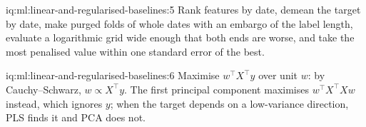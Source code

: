 \begin{solution}{iq:ml:linear-and-regularised-baselines:5}
Rank features by date, demean the target by date, make purged folds of whole dates with an embargo of the label length,
evaluate a logarithmic grid wide enough that both ends are worse, and take the most penalised value within one standard
error of the best.
\end{solution}

\begin{solution}{iq:ml:linear-and-regularised-baselines:6}
Maximise $w^\top X^\top y$ over unit $w$: by Cauchy--Schwarz, $w\propto X^\top y$. The first principal component maximises
$w^\top X^\top Xw$ instead, which ignores $y$; when the target depends on a low-variance direction, PLS finds it and PCA
does not.
\end{solution}

